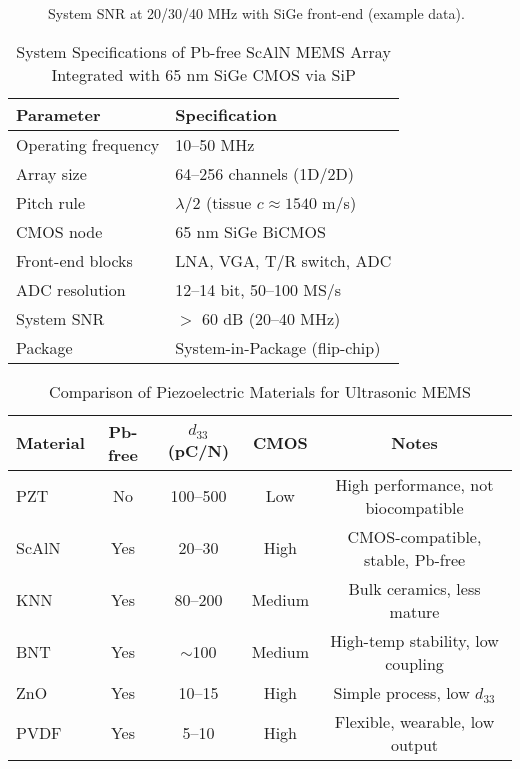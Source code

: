 \documentclass[conference]{IEEEtran}
\begin{document}
\begin{figure}[htbp]
\centering
{}
\caption{System SNR at 20/30/40 MHz with SiGe front-end (example data).}
\label{fig:snr_freq}
\end{figure}

\begin{table}[htbp]
\caption{System Specifications of Pb-free ScAlN MEMS Array Integrated with 65 nm SiGe CMOS via SiP}
\label{tab:system_specs}
\centering
\begin{tabular}{|l|l|}
\hline
\textbf{Parameter} & \textbf{Specification} \\ \hline
Operating frequency & 10--50 MHz \\ \hline
Array size & 64--256 channels (1D/2D) \\ \hline
Pitch rule & $\lambda/2$ (tissue $c \approx 1540$ m/s) \\ \hline
CMOS node & 65 nm SiGe BiCMOS \\ \hline
Front-end blocks & LNA, VGA, T/R switch, ADC \\ \hline
ADC resolution & 12--14 bit, 50--100 MS/s \\ \hline
System SNR & $>$ 60 dB (20--40 MHz) \\ \hline
Package & System-in-Package (flip-chip) \\ \hline
\end{tabular}
\end{table}

\begin{table}[htbp]
\caption{Comparison of Piezoelectric Materials for Ultrasonic MEMS}
\label{tab:materials}
\centering
\begin{tabular}{|l|c|c|c|c|}
\hline
\textbf{Material} & \textbf{Pb-free} & \textbf{$d_{33}$ (pC/N)} & \textbf{CMOS} & \textbf{Notes} \\ \hline
PZT & No  & 100--500 & Low  & High performance, not biocompatible \\ \hline
ScAlN & Yes & 20--30  & High & CMOS-compatible, stable, Pb-free \\ \hline
KNN & Yes & 80--200 & Medium & Bulk ceramics, less mature \\ \hline
BNT & Yes & $\sim$100 & Medium & High-temp stability, low coupling \\ \hline
ZnO  & Yes & 10--15  & High & Simple process, low $d_{33}$ \\ \hline
PVDF & Yes & 5--10   & High & Flexible, wearable, low output \\ \hline
\end{tabular}
\end{table}
\end{document}
